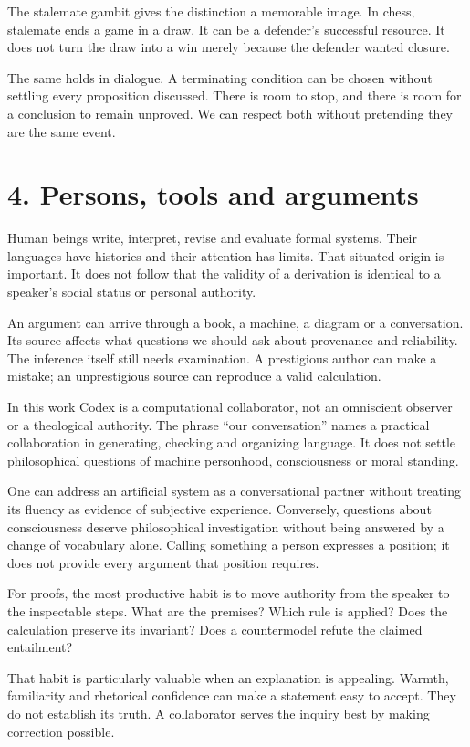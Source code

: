 \documentclass[10pt]{article}
\begin{document}
The stalemate gambit gives the distinction a memorable image. In chess, stalemate ends a game in a draw. It can be a defender's successful resource. It does not turn the draw into a win merely because the defender wanted closure.

The same holds in dialogue. A terminating condition can be chosen without settling every proposition discussed. There is room to stop, and there is room for a conclusion to remain unproved. We can respect both without pretending they are the same event.

\clearpage
\section*{4. Persons, tools and arguments}
Human beings write, interpret, revise and evaluate formal systems. Their languages have histories and their attention has limits. That situated origin is important. It does not follow that the validity of a derivation is identical to a speaker's social status or personal authority.

An argument can arrive through a book, a machine, a diagram or a conversation. Its source affects what questions we should ask about provenance and reliability. The inference itself still needs examination. A prestigious author can make a mistake; an unprestigious source can reproduce a valid calculation.

In this work Codex is a computational collaborator, not an omniscient observer or a theological authority. The phrase ``our conversation'' names a practical collaboration in generating, checking and organizing language. It does not settle philosophical questions of machine personhood, consciousness or moral standing.

One can address an artificial system as a conversational partner without treating its fluency as evidence of subjective experience. Conversely, questions about consciousness deserve philosophical investigation without being answered by a change of vocabulary alone. Calling something a person expresses a position; it does not provide every argument that position requires.

For proofs, the most productive habit is to move authority from the speaker to the inspectable steps. What are the premises? Which rule is applied? Does the calculation preserve its invariant? Does a countermodel refute the claimed entailment?

That habit is particularly valuable when an explanation is appealing. Warmth, familiarity and rhetorical confidence can make a statement easy to accept. They do not establish its truth. A collaborator serves the inquiry best by making correction possible.
\end{document}
